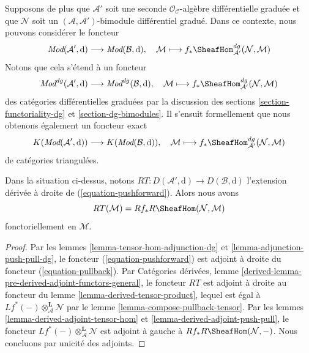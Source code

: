 \medskip\noindent
Supposons de plus que $\mathcal{A}'$ soit une seconde
$\mathcal{O}_\mathcal{C}$-algèbre différentielle graduée et que $\mathcal{N}$ soit un
$(\mathcal{A}, \mathcal{A}')$-bimodule différentiel gradué. Dans ce
contexte, nous pouvons considérer le foncteur
$$
\textit{Mod}(\mathcal{A}', \text{d})
\longrightarrow
\textit{Mod}(\mathcal{B}, \text{d}),\quad
\mathcal{M} \longmapsto
f_*\SheafHom^{dg}_{\mathcal{A}'}(\mathcal{N}, \mathcal{M})
$$
Notons que cela s'étend à un foncteur
$$
\textit{Mod}^{dg}(\mathcal{A}', \text{d})
\longrightarrow
\textit{Mod}^{dg}(\mathcal{B}, \text{d}),\quad
\mathcal{M} \longmapsto
f_*\SheafHom^{dg}_{\mathcal{A}'}(\mathcal{N}, \mathcal{M})
$$ des
catégories différentielles graduées par la discussion des
sections \ref{section-functoriality-dg} et \ref{section-dg-bimodules}. Il
s'ensuit formellement que nous obtenons également un foncteur
exact \begin{equation}
\label{equation-pushforward}
K(\textit{Mod}(\mathcal{A}', \text{d}))
\longrightarrow
K(\textit{Mod}(\mathcal{B}, \text{d})),\quad
\mathcal{M} \longmapsto
f_*\SheafHom^{dg}_{\mathcal{A}'}(\mathcal{N}, \mathcal{M})
\end{equation}
de catégories triangulées.

\begin{lemma}
\label{lemma-compose-pushforward-hom} Dans
la situation ci-dessus, notons $RT : D(\mathcal{A}', \text{d}) \to
D(\mathcal{B}, \text{d})$ l'extension dérivée à droite de
(\ref{equation-pushforward}). Alors nous avons
$$
RT(\mathcal{M}) = Rf_* R\SheafHom(\mathcal{N}, \mathcal{M})
$$
fonctoriellement en $\mathcal{M}$.
\end{lemma}

\begin{proof}
Par les lemmes \ref{lemma-tensor-hom-adjunction-dg}
et \ref{lemma-adjunction-push-pull-dg}, le foncteur
(\ref{equation-pushforward}) est adjoint à droite
du foncteur (\ref{equation-pullback}). Par Catégories dérivées, lemme
\ref{derived-lemma-pre-derived-adjoint-functors-general},
le foncteur $RT$ est adjoint à droite au foncteur
du lemme \ref{lemma-derived-tensor-product}, lequel est égal à
$Lf^*(-) \otimes_\mathcal{A}^\mathbf{L} \mathcal{N}$ par le
lemme \ref{lemma-compose-pullback-tensor}.
Par les lemmes \ref{lemma-derived-adjoint-tensor-hom}
et \ref{lemma-derived-adjoint-push-pull}, le foncteur
$Lf^*(-) \otimes_\mathcal{A}^\mathbf{L} \mathcal{N}$
est adjoint à gauche
à $Rf_* R\SheafHom(\mathcal{N}, -)$.
Nous concluons par unicité des adjoints.
\end{proof}

